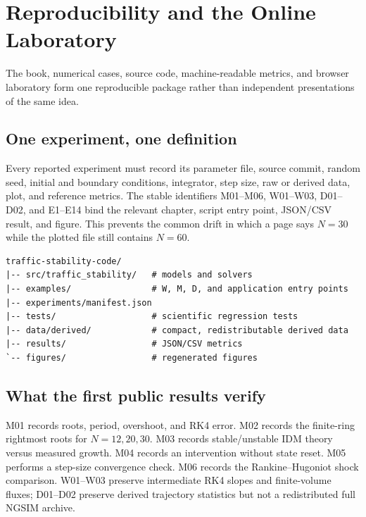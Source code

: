 \documentclass[11pt,a4paper,openany]{book}
\numberwithin{equation}{chapter}
\numberwithin{figure}{chapter}
\numberwithin{table}{chapter}
\newcommand{\chapterguide}[1]{\begin{tcolorbox}[keybox,title=Chapter guide]#1\end{tcolorbox}}
\begin{document}
\chapter{Reproducibility and the Online Laboratory}
\chapterguide{The book, numerical cases, source code, machine-readable metrics, and browser laboratory form one reproducible package rather than independent presentations of the same idea.}

\section{One experiment, one definition}
Every reported experiment must record its parameter file, source commit, random seed, initial and boundary conditions, integrator, step size, raw or derived data, plot, and reference metrics. The stable identifiers M01--M06, W01--W03, D01--D02, and E1--E14 bind the relevant chapter, script entry point, JSON/CSV result, and figure. This prevents the common drift in which a page says $N=30$ while the plotted file still contains $N=60$.

\begin{verbatim}
traffic-stability-code/
|-- src/traffic_stability/   # models and solvers
|-- examples/                # W, M, D, and application entry points
|-- experiments/manifest.json
|-- tests/                   # scientific regression tests
|-- data/derived/            # compact, redistributable derived data
|-- results/                 # JSON/CSV metrics
`-- figures/                 # regenerated figures
\end{verbatim}

\section{What the first public results verify}
M01 records roots, period, overshoot, and RK4 error. M02 records the finite-ring rightmost roots for $N=12,20,30$. M03 records stable/unstable IDM theory versus measured growth. M04 records an intervention without state reset. M05 performs a step-size convergence check. M06 records the Rankine--Hugoniot shock comparison. W01--W03 preserve intermediate RK4 slopes and finite-volume fluxes; D01--D02 preserve derived trajectory statistics but not a redistributed full NGSIM archive.
\end{document}
